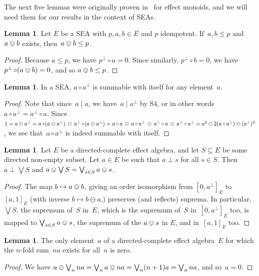 \documentclass[a4paper, onecolumn, accepted=2020-12-22]{quantumarticle}
\newcommand{\mult}{\mathop{\circ}}
\newcommand{\commu}{\mathrel{\lvert}}
\newcounter{counter}
\theoremstyle{definition}
\newtheorem{lemma}[counter]{Lemma}
\begin{document}
The next five lemmas were originally
    proven in~\cite{first} for effect monoids,
    and we will need them for our results in the context of SEAs.

\begin{lemma}\label{lem:summableunderidempotent}
Let $E$ be a SEA with $p,a,b \in E$ and $p$ idempotent.
    If~$a,b\leq p$ and~$a\ovee b$ exists,
then~$a\ovee b\leq p$.
\end{lemma}
\begin{proof}
Because $a\leq p$, we have $p^\perp \mult a = 0$.
Since similarly, $p^\perp\mult b=0$,
    we have $p^\perp\mult (a\ovee b)
    = 0$, and so $a\ovee b \leq p$.
\end{proof}


\begin{lemma}\label{lem:selfsummable}
    In a SEA, $a \mult a^\perp$ is summable with itself for any element~$a$.
\end{lemma}
\begin{proof}
Note that since~$a\commu a$,
we have~$a\commu a^\perp$ by S4,
or in other words  $a\mult a^\perp = a^\perp \mult a$.
Since
    $1=a\ovee a^\perp 
    = a\mult (a\ovee a^\perp) \,\ovee\, a^\perp\mult (a\ovee a^\perp)
    = a\mult a\,\ovee\, a\mult a^\perp\,\ovee\, a^\perp \mult a
    \,\ovee\, a^\perp \mult a^\perp =
    a^2 \ovee 2(a \mult a^\perp )\ovee (a^\perp)^2$,
    we see that~$a\mult a^\perp$ is indeed summable with itself.
\end{proof}

\begin{lemma}\label{lem:addition-normal}
    Let $E$ be a directed-complete effect algebra, and let $S\subseteq E$ be some directed non-empty subset. Let $a\in E$ be such that $a\perp s$ for all $s\in S$. Then $a\perp \bigvee S$ and $a\ovee \bigvee S = \bigvee_{s\in S} a\ovee s$.
\end{lemma}
\begin{proof}
    The map $b\mapsto a\ovee b$, giving an order 
    isomorphism from $[0, a^\perp]_E$ to $[a, 1]_E$ 
    (with inverse $b\mapsto b\ominus a$,)
    preserves (and reflects) suprema.
    In particular, $\bigvee S$,
    the supremum of~$S$ in~$E$,
    which is the supremum of~$S$ in~$[0,a^\perp]_E$ too,
    is mapped to $\bigvee_{s\in S} a\ovee s$,
    the supremum of the $a\ovee s$ in $E$, and in~$[a,1]_E$ too.
\end{proof}

\begin{lemma}
\label{lem:archemedeanomegadirectedcomplete}
The only element~$a$ of a directed-complete
effect algebra~$E$
for which the $n$-fold sum~$na$ exists for all~$n$
is zero.
\end{lemma}
\begin{proof}
We have $a\ovee \bigvee_n na
    =\bigvee_n a\ovee na
    = \bigvee_n (n+1)a = \bigvee_n na$,
    and so~$a=0$.
\end{proof}
\end{document}
